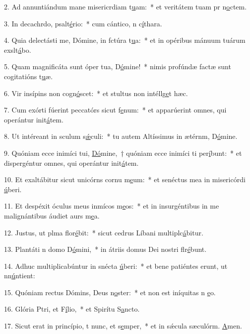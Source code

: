 2. Ad annuntiándum mane misericrdiam t\uline{u}am:~* et veritátem tuam pr n\uline{o}ctem.\par 
3. In decachrdo, psalt\uline{é}rio:~* cum cántico, n c\uline{í}thara.\par 
4. Quia delectásti me, Dómine, in fctúra t\uline{u}a:~* et in opéribus mánuum tuárum exslt\uline{á}bo.\par 
5. Quam magnificáta sunt óper tua, D\uline{ó}mine!~* nimis profúndæ factæ sunt cogitatións t\uline{u}æ.\par 
6. Vir insípins non cogn\uline{ó}scet:~* et stultus non intéllg\uline{e}t hæc.\par 
7. Cum exórti fúerint peccatórs sicut f\uline{e}num:~* et apparúerint omnes, qui operántur init\uline{á}tem.\par 
8. Ut intéreant in sculum s\uline{ǽ}culi:~* tu autem Altíssimus in ætérnm, D\uline{ó}mine.\par 
9. Quóniam ecce inimíci tui, \uline{Dó}mine,~† quóniam ecce inimíci ti per\uline{í}bunt:~* et dispergéntur omnes, qui operántur init\uline{á}tem.\par 
10. Et exaltábitur sicut unicórns cornu m\uline{e}um:~* et senéctus mea in misericórdi \uline{ú}beri.\par 
11. Et despéxit óculus meus inmícos m\uline{e}os:~* et in insurgéntibus in me malignántibus áudiet aurs m\uline{e}a.\par 
12. Justus, ut plma flor\uline{é}bit:~* sicut cedrus Líbani multiplc\uline{á}bitur.\par 
13. Plantáti n domo D\uline{ó}mini,~* in átriis domus Dei nostri flr\uline{é}bunt.\par 
14. Adhuc multiplicabúntur in snécta \uline{ú}beri:~* et bene patiéntes erunt, ut nn\uline{ú}ntient:\par 
15. Quóniam rectus Dómins, Deus n\uline{o}ster:~* et non est iníquitas n \uline{e}o.\par 
16. Glória Ptri, et F\uline{í}lio,~* et Spirítu S\uline{a}ncto.\par 
17. Sicut erat in princípio, t nunc, et s\uline{e}mper,~* et in sǽcula sæculórm. \uline{A}men.\par 
